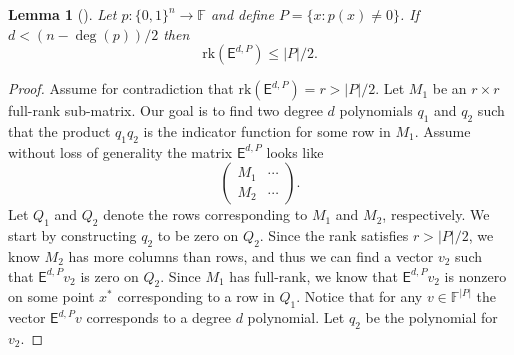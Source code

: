 \documentclass[11pt]{article}
\newtheorem{lemma}[theorem]{Lemma}
\theoremstyle{definition}
\newcommand{\rk}{\mathrm{rk}}
\newcommand{\1}{\mathbf{1}}
\newcommand{\F}{{\mathbb F}}
\renewcommand{\leq}{\leqslant}
\renewcommand{\geq}{\geqslant}
\newcommand{\bool}{:\{-1,1\}^n \to \{-1,1\}}
\newcommand{\eds}{ \mathsf{E}^{d,S}}
\newcommand{\edt}{\mathsf{E}^{d,T}}
\newcommand{\sstr}{\mathsf{sstr}}
\newcommand{\vc}{\mathsf{VC}}
\newcommand{\bitsz}{\{0,1\}^n}
\begin{document}
\begin{appendix}


\begin{lemma}[\cite{smolensky}]\label{lemma2} Let $p:\bitsz \to \F$ and define  $P = \{x  :  p(x) \neq 0\}$.   If $d < (n - \deg(p))/2$ then 
\[ \rk(\mathsf{E}^{d,P}) \leq |P|/2. \] 
\end{lemma}
\begin{proof} Assume for contradiction that $\rk(\mathsf{E}^{d,P}) = r > |P|/2$.  %
Let $M_1$ be an $r \times r$ full-rank sub-matrix.  Our goal is to find two degree $d$  polynomials $q_1$ and $q_2$ such that the product $q_1q_2$ is the indicator function for some row in $M_1$.  
Assume without loss of generality the matrix $\mathsf{E}^{d,P}$ looks like 
\[\left( \begin{array}{c|c} M_1 & \cdots \\\hline M_2 & \cdots \end{array}\right ).\]
Let $Q_1$ and $Q_2$ denote the rows corresponding to $M_1$ and $M_2$, respectively.  We start by constructing $q_2$ to be zero on $Q_2$.  Since the rank satisfies $r > |P|/2$, we know $M_2$ has more columns than rows, and thus we can find a vector $v_2$ such that $\mathsf{E}^{d,P}v_2$ is zero on $Q_2$.  Since $M_1$ has full-rank, we know that $\mathsf{E}^{d,P}v_2$ is nonzero on some point $x^*$ corresponding to a row in $Q_1$.  Notice that for any $v \in \F^{|P|}$ the vector $\mathsf{E}^{d,P}v$  corresponds to a degree $d$ polynomial.   Let $q_2$ be the polynomial for~$v_2$. 


\end{proof}
\end{appendix}
\end{document}
